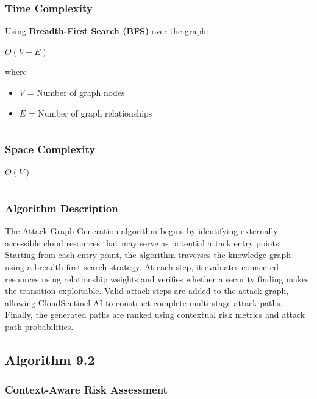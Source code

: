 \subsubsection{Time Complexity}

Using \textbf{Breadth-First Search (BFS)} over the graph:

$O(V + E)$

where

\begin{itemize}
\tightlist
\item
$V$ = Number of graph nodes\\
\item
$E$ = Number of graph relationships
\end{itemize}

\begin{center}\rule{0.5\linewidth}{0.5pt}\end{center}

\subsubsection{Space Complexity}

$O(V)$

\begin{center}\rule{0.5\linewidth}{0.5pt}\end{center}

\subsubsection{Algorithm Description}

The Attack Graph Generation algorithm begins by identifying externally accessible cloud resources that may serve as potential attack entry points. Starting from each entry point, the algorithm traverses the knowledge graph using a breadth-first search strategy. At each step, it evaluates connected resources using relationship weights and verifies whether a security finding makes the transition exploitable. Valid attack steps are added to the attack graph, allowing CloudSentinel AI to construct complete multi-stage attack paths. Finally, the generated paths are ranked using contextual risk metrics and attack path probabilities.

\subsection{Algorithm 9.2}

\subsubsection{Context-Aware Risk Assessment}

